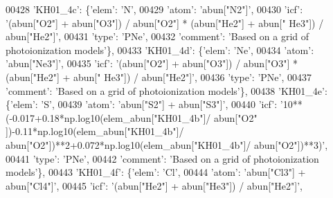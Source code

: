 \begin{DoxyCode}
00428                          \textcolor{stringliteral}{'KH01\_4c'}: \{\textcolor{stringliteral}{'elem'}: \textcolor{stringliteral}{'N'},
00429                                      \textcolor{stringliteral}{'atom'}: \textcolor{stringliteral}{'abun["N2"]'},
00430                                      \textcolor{stringliteral}{'icf'}: \textcolor{stringliteral}{'(abun["O2"] + abun["O3"]) / abun["O2"] * (abun["He2"] + abun["
      He3"]) / abun["He2"]'},
00431                                      \textcolor{stringliteral}{'type'}: \textcolor{stringliteral}{'PNe'},
00432                                      \textcolor{stringliteral}{'comment'}: \textcolor{stringliteral}{'Based on a grid of photoionization models'}\},
00433                          \textcolor{stringliteral}{'KH01\_4d'}: \{\textcolor{stringliteral}{'elem'}: \textcolor{stringliteral}{'Ne'},
00434                                      \textcolor{stringliteral}{'atom'}: \textcolor{stringliteral}{'abun["Ne3"]'},
00435                                      \textcolor{stringliteral}{'icf'}: \textcolor{stringliteral}{'(abun["O2"] + abun["O3"]) / abun["O3"] * (abun["He2"] + abun["
      He3"]) / abun["He2"]'},
00436                                      \textcolor{stringliteral}{'type'}: \textcolor{stringliteral}{'PNe'},
00437                                      \textcolor{stringliteral}{'comment'}: \textcolor{stringliteral}{'Based on a grid of photoionization models'}\},
00438                          \textcolor{stringliteral}{'KH01\_4e'}: \{\textcolor{stringliteral}{'elem'}: \textcolor{stringliteral}{'S'},
00439                                      \textcolor{stringliteral}{'atom'}: \textcolor{stringliteral}{'abun["S2"] + abun["S3"]'},
00440                                      \textcolor{stringliteral}{'icf'}: \textcolor{stringliteral}{'10**(-0.017+0.18*np.log10(elem\_abun["KH01\_4b"]/ abun["O2"
      ])-0.11*np.log10(elem\_abun["KH01\_4b"]/ abun["O2"])**2+0.072*np.log10(elem\_abun["KH01\_4b"]/ abun["O2"])**3)'},
00441                                      \textcolor{stringliteral}{'type'}: \textcolor{stringliteral}{'PNe'},
00442                                      \textcolor{stringliteral}{'comment'}: \textcolor{stringliteral}{'Based on a grid of photoionization models'}\},
00443                          \textcolor{stringliteral}{'KH01\_4f'}: \{\textcolor{stringliteral}{'elem'}: \textcolor{stringliteral}{'Cl'},
00444                                      \textcolor{stringliteral}{'atom'}: \textcolor{stringliteral}{'abun["Cl3"] + abun["Cl4"]'},
00445                                      \textcolor{stringliteral}{'icf'}: \textcolor{stringliteral}{'(abun["He2"] + abun["He3"]) / abun["He2"]'},

\end{DoxyCode}
